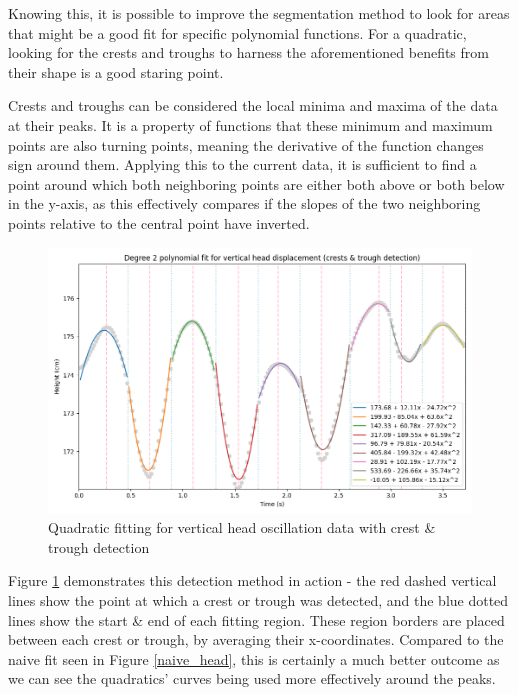 \documentclass[12pt, a4paper]{article}
\begin{document}
Knowing this, it is possible to improve the segmentation method to look for
areas that might be a good fit for specific polynomial functions. For a
quadratic, looking for the crests and troughs to harness the aforementioned
benefits from their shape is a good staring point.

Crests and troughs can be considered the local minima and maxima of the data at
their peaks. It is a property of functions that these minimum and maximum points
are also turning points, meaning the derivative of the function changes sign
around them. Applying this to the current data, it is sufficient to find a point
around which both neighboring points are either both above or both below in the
y-axis, as this effectively compares if the slopes of the two neighboring
points relative to the central point have inverted.

\begin{figure}[H]
    \centering
    \includegraphics[width=14cm]{p_peaks_head_2.png}
    \caption{ Quadratic fitting for vertical head oscillation data with crest \&
        trough detection}
    \label{peaks_head}
\end{figure}

Figure \ref{peaks_head} demonstrates this detection method in action - the red
dashed vertical lines show the point at which a crest or trough was detected,
and the blue dotted lines show the start \& end of each fitting region. These
region borders are placed between each crest or trough, by averaging their
x-coordinates. Compared to the naive fit seen in Figure \ref{naive_head}, this
is certainly a much better outcome as we can see the quadratics' curves being
used more effectively around the peaks.
\end{document}
